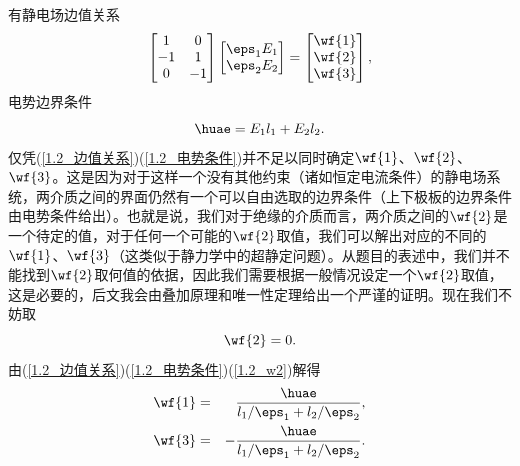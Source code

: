 有静电场边值关系
\begin{equation}
    \begin{bmatrix}
    1  & 0\\
    -1 & 1\\
    0  & -1
    \end{bmatrix}
    \begin{bmatrix}
    \eps_1 E_1\\
    \eps_2 E_2
    \end{bmatrix}
    =
    \begin{bmatrix}
    \wf{1}\\
    \wf{2}\\
    \wf{3}
    \end{bmatrix},
    \label{1.2_边值关系}
\end{equation}
电势边界条件
\begin{equation}
    \huae = E_1 l_1 + E_2 l_2. \label{1.2_电势条件}
\end{equation}
仅凭(\ref{1.2_边值关系})(\ref{1.2_电势条件})并不足以同时确定$\wf{1}$、$\wf{2}$、$\wf{3}$。这是因为对于这样一个没有其他约束（诸如恒定电流条件）的静电场系统，两介质之间的界面仍然有一个可以自由选取的边界条件（上下极板的边界条件由电势条件给出）。也就是说，我们对于绝缘的介质而言，两介质之间的$\wf{2}$是一个待定的值，对于任何一个可能的$\wf{2}$取值，我们可以解出对应的不同的$\wf{1}$、$\wf{3}$（这类似于静力学中的超静定问题）。从题目的表述中，我们并不能找到$\wf{2}$取何值的依据，因此我们需要根据一般情况设定一个$\wf{2}$取值，这是必要的，后文我会由叠加原理和唯一性定理给出一个严谨的证明。现在我们不妨取
\begin{equation}
    \wf{2} = 0. \label{1.2_w2}
\end{equation}
由(\ref{1.2_边值关系})(\ref{1.2_电势条件})(\ref{1.2_w2})解得
\begin{eqnarray}
    \wf{1} &=& \frac{\huae}{{l_1}/{\eps_1}+{l_2}/{\eps_2}}, \label{1.2_w1} \\
    \wf{3} &=& - \frac{\huae}{{l_1}/{\eps_1}+{l_2}/{\eps_2}}.  \label{1.2_w3}
\end{eqnarray}

